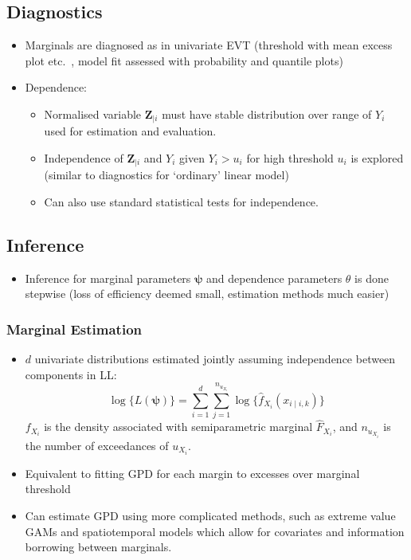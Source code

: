 \documentclass{article}
\numberwithin{equation}{section}
\begin{document}
\subsection{Diagnostics}

\begin{itemize}
  \item Marginals are diagnosed as in univariate EVT (threshold with mean excess plot etc.\ , model fit assessed with probability and quantile plots)
  \item Dependence:
    \begin{itemize}
      \item Normalised variable $\bm{Z}_{\mid i}$ must have stable distribution over range of $Y_i$ used for estimation and evaluation. 
      \item Independence of $\bm{Z}_{\mid i}$ and $Y_i$ given $Y_i > u_i$ for high threshold $u_i$ is explored (similar to diagnostics for `ordinary' linear model)
      \item Can also use standard statistical tests for independence. 
    \end{itemize}
\end{itemize}

\subsection{Inference}

\begin{itemize}
  \item Inference for marginal parameters $\bm{\psi}$ and dependence parameters $\theta$ is done stepwise (loss of efficiency deemed small, estimation methods much easier)
\end{itemize}

\subsubsection{Marginal Estimation}

\begin{itemize}
  \item $d$ univariate distributions estimated jointly assuming independence between components in LL:
    \[
      \log\{L(\bm{\psi})\} = \sum_{i=1}^{d}{\sum_{j=1}^{n_{u_{X_i}}}{\log\{\hat{f}_{X_i}(x_{i \mid i, k})\}}}
    \]
    $f_{X_i}$ is the density associated with semiparametric marginal $\hat{F}_{X_i}$, and $n_{u_{X_i}}$ is the number of exceedances of $u_{X_i}$.
  \item Equivalent to fitting GPD for each margin to excesses over marginal threshold
  \item Can estimate GPD using more complicated methods, such as extreme value GAMs and spatiotemporal models which allow for covariates and information borrowing between marginals.
\end{itemize}
\end{document}
